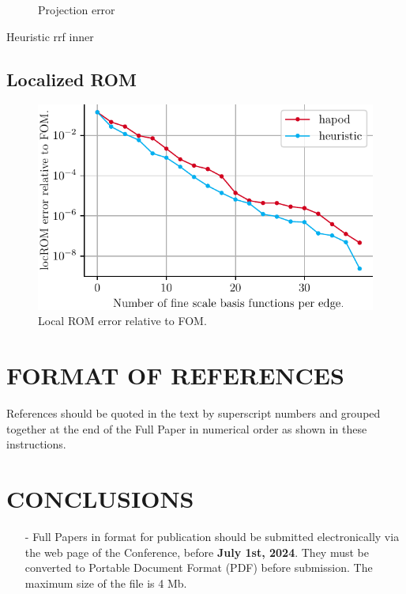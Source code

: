 \documentclass[a4paper]{eccomas_paper-2024}
\begin{document}
\begin{figure}[!htb]
\begin{center}
  \caption{Projection error }\label{fig:proj_error_inner_heuristic}
\endminipage
\end{center}
\end{figure}

\begin{table}
    \centering
    \caption{Heuristic rrf inner}\label{tab:heuristic_inner}
    
\end{table}

\subsection{Localized ROM}

\begin{figure}[!htb]
    \centering
    \includegraphics{./figures/beam/fig_loc_rom_error.pdf}
    \caption{Local ROM error relative to FOM.}\label{fig:loc_rom_error}
\end{figure}

\section{FORMAT OF REFERENCES}

References should be quoted in the text by superscript
numbers \cite{McQuerry18,nssga,Oden18} and grouped together at the end of the Full Paper in numerical order as shown in these instructions.

\section{CONCLUSIONS}

\begin{itemize}
\item[-] Full Papers in format for publication should be submitted electronically via the web page of the Conference, before \textbf{July 1st, 2024}. They must be converted to  Portable Document Format (PDF) before submission. The maximum size of the file is 4 Mb.
\end{itemize}
\end{document}

